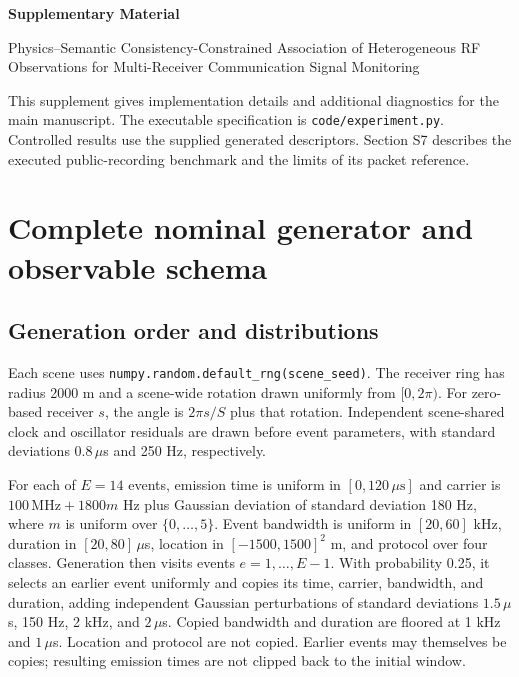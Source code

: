 \documentclass[10pt,a4paper]{article}
\begin{document}
\begin{center}
{\Large\bfseries Supplementary Material}\par\vspace{5pt}
{\large Physics--Semantic Consistency-Constrained Association of Heterogeneous RF Observations for Multi-Receiver Communication Signal Monitoring}
\end{center}
\noindent This supplement gives implementation details and additional diagnostics for the main manuscript. The executable specification is \texttt{code/experiment.py}. Controlled results use the supplied generated descriptors. Section S7 describes the executed public-recording benchmark and the limits of its packet reference.

\section{Complete nominal generator and observable schema}
\subsection{Generation order and distributions}
Each scene uses \texttt{numpy.random.default\_rng(scene\_seed)}. The receiver ring has radius 2000 m and a scene-wide rotation drawn uniformly from $[0,2\pi)$. For zero-based receiver $s$, the angle is $2\pi s/S$ plus that rotation. Independent scene-shared clock and oscillator residuals are drawn before event parameters, with standard deviations $0.8\,\mu$s and 250 Hz, respectively.

For each of $E=14$ events, emission time is uniform in $[0,120\,\mu\mathrm{s}]$ and carrier is $100\,\mathrm{MHz}+1800m$ Hz plus Gaussian deviation of standard deviation 180 Hz, where $m$ is uniform over $\{0,\ldots,5\}$. Event bandwidth is uniform in $[20,60]$ kHz, duration in $[20,80]\,\mu$s, location in $[-1500,1500]^2$ m, and protocol over four classes. Generation then visits events $e=1,\ldots,E-1$. With probability 0.25, it selects an earlier event uniformly and copies its time, carrier, bandwidth, and duration, adding independent Gaussian perturbations of standard deviations $1.5\,\mu$s, 150 Hz, 2 kHz, and $2\,\mu$s. Copied bandwidth and duration are floored at 1 kHz and $1\,\mu$s. Location and protocol are not copied. Earlier events may themselves be copies; resulting emission times are not clipped back to the initial window.
\end{document}
